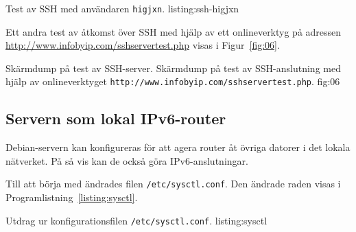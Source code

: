             {Test av SSH med användaren \texttt{higjxn}.}
            {listing:ssh-higjxn}

Ett andra test av åtkomst över SSH med hjälp av ett onlineverktyg på adressen
\url{http://www.infobyip.com/sshservertest.php} \cite{ipv6:sshservertest}
visas i Figur~\ref{fig:06}.

           {Skärmdump på test av SSH-server.}
					 {Skärmdump på test av SSH-anslutning med hjälp av onlineverktyget 
				    \texttt{http://www.infobyip.com/sshservertest.php}.}
           {fig:06}


\subsection{Servern som lokal IPv6-router}
Debian-servern kan konfigureras för att agera router åt övriga datorer i det
lokala nätverket. På så vis kan de också göra IPv6-anslutningar.

Till att börja med ändrades filen \texttt{/etc/sysctl.conf}. Den ändrade
raden visas i Programlistning~\ref{listing:sysctl}.

             {Utdrag ur konfigurationsfilen \texttt{/etc/sysctl.conf}.}
             {listing:sysctl}
